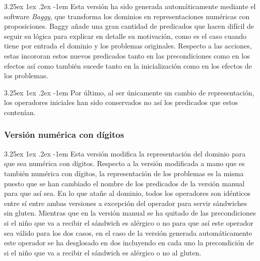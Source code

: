 \documentclass{article}
\makeatletter
\renewcommand\paragraph{\@startsection{paragraph}{5}{\z@}%
      {3.25ex \@plus1ex \@minus.2ex}%
      {-1em}%
      {\normalfont\normalsize\bfseries}}
\makeatother
\begin{document}
    \paragraph{}
    Esta versión ha sido generada automáticamente mediante el software \textit{Baggy}, que transforma los dominios en representaciones numéricas con proposiciones. Baggy añade una gran cantidad de predicados que hacen difícil de seguir su lógica para explicar en detalle su motivación, como es el caso cuando tiene por entrada el dominio y los problemas originales. Respecto a las acciones, estas incororan estos nuevos predicados tanto en las precondiciones como en los efectos así como también sucede tanto en la inicialización como en los efectos de los problemas.
    
    \paragraph{}
    Por último, al ser únicamente un cambio de representación, los operadores iniciales han sido conservados no así los predicados que estos contenían.
    
    \subsubsection{Versión numérica con dígitos}
    \paragraph{}
    Esta versión modifica la representación del dominio para que sea numérica con dígitos. Respecto a la versión modificada a mano que es también numérica con dígitos, la representación de los problemas es la misma puesto que se han cambiado el nombre de los predicados de la versión manual para que así sea. En lo que atañe al dominio, todos los operadores son idénticos entre sí entre ambas versiones a excepción del operador para servir sándwiches sin gluten. Mientras que en la versión manual se ha quitado de las precondiciones si el niño que va a recibir el sándwich es alérgico o no para que así este operador sea válido para los dos casos, en el caso de la versión generada automáticamente este operador se ha desglosado en dos incluyendo en cada uno la precondición de si el niño que va a recibir el sándwich es alérgico o no al gluten.
    
\end{document}

